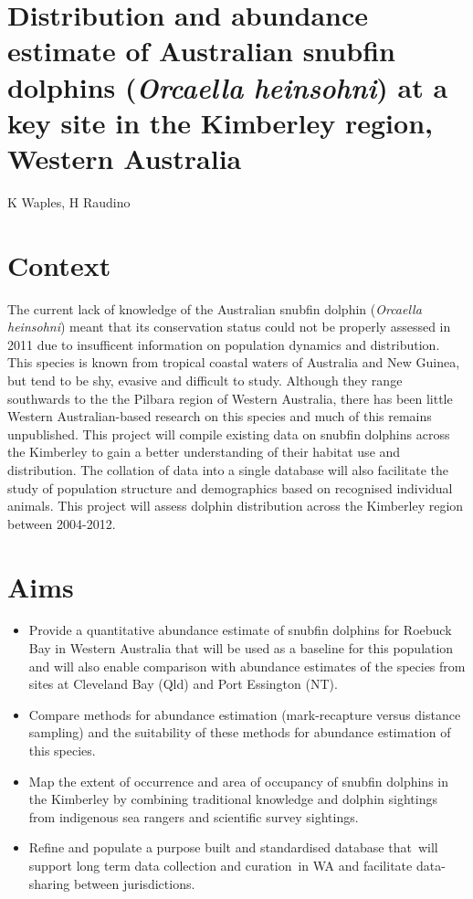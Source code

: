 \documentclass[version=last,
    paper=a4, %
    10pt, %
    usenames,
    dvipsnames,
    oneside, %
    headings=openany, %
    DIV=15 %
]{scrbook}
\begin{document}
\section*{Distribution and abundance estimate of Australian snubfin dolphins
(\emph{Orcaella heinsohni}) at a key site in the Kimberley region,
Western Australia
}

K Waples, H Raudino



\section*{Context}

The current lack of knowledge of the Australian snubfin dolphin
(\emph{Orcaella heinsohni}) meant that its conservation status could not
be properly assessed in 2011 due to insufficent information on
population dynamics and distribution. This species is known from
tropical coastal waters of Australia and New Guinea, but tend to be shy,
evasive and difficult to study. Although they range southwards to the
the Pilbara region of Western Australia, there has been little Western
Australian-based research on this species and much of this remains
unpublished. This project will compile existing data on snubfin dolphins
across the Kimberley to gain a better understanding of their habitat use
and distribution. The collation of data into a single database will also
facilitate the study of population structure and demographics based on
recognised individual animals. This project will assess dolphin
distribution across the Kimberley region between 2004-2012.




\section*{Aims}

\begin{itemize}
\itemsep1pt\parskip0pt
\item
  Provide a quantitative abundance estimate of snubfin dolphins for
  Roebuck Bay in Western Australia that will be used as a baseline for
  this population and will also enable comparison with abundance
  estimates of the species from sites at Cleveland Bay (Qld) and Port
  Essington (NT).
\item
  Compare methods for abundance estimation (mark-recapture versus
  distance sampling) and the suitability of these methods for abundance
  estimation of this species.
\item
  Map the extent of occurrence and area of occupancy of snubfin dolphins
  in the Kimberley by combining traditional knowledge and dolphin
  sightings from indigenous sea rangers and scientific survey sightings.
\item
  Refine and populate a purpose built and standardised database
  that~will support long term data collection and curation~in WA and
  facilitate data-sharing between jurisdictions.
\end{itemize}
\end{document}
